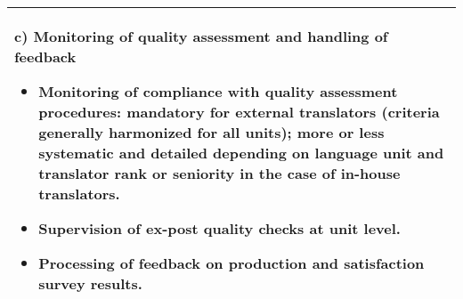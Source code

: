 \documentclass[output=paper]{langsci/langscibook}
\begin{document}
\begin{table}[p]
\begin{tabularx}{\textwidth}{Q}
{\textbf{c) Monitoring of quality assessment and handling of feedback}


\begin{itemize}
\item 
Monitoring of compliance with quality assessment procedures: mandatory for external translators (criteria generally harmonized for all units); more or less systematic and detailed depending on language unit and translator rank or seniority in the case of in-house translators.
\item 
Supervision of ex-post quality checks at unit level.
\item 
Processing of feedback on production and satisfaction survey results.
\end{itemize}
}\\
\midrule
\end{tabularx}
\end{table}
\end{document}
